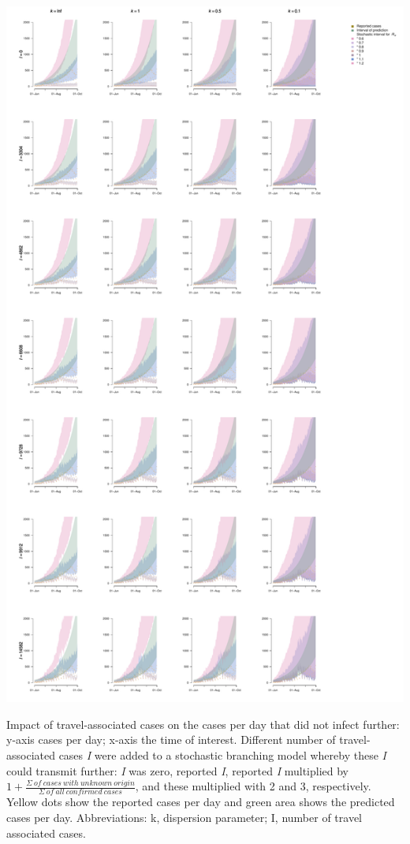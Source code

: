 \documentclass[10pt, a4paper, twoside]{article}
\begin{document}
\clearpage
\begin{suppfigure}[h]
\centering
\includegraphics[scale=0.3]{sim_cases_d_imports_2021-02-24.pdf}
\caption{Impact of travel-associated cases on the cases per day that did not infect further: y-axis cases per day; x-axis the time of interest. Different number of travel-associated cases \emph{I} were added to a stochastic branching model whereby these \emph{I} could transmit further: \emph{I} was zero, reported \emph{I}, reported \emph{I} multiplied by $1+ \frac{\Sigma ~of ~cases ~with ~unknown ~origin }{\Sigma ~of ~all ~confirmed ~cases}$, and these multiplied with 2 and 3, respectively. Yellow dots show the reported cases per day and green area shows the predicted cases per day. Abbreviations: k, dispersion parameter; I, number of travel associated cases.}
\end{suppfigure}
\end{document}
